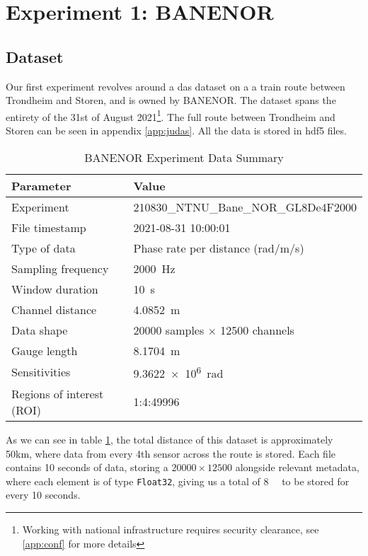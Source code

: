 \section{Experiment 1: BANENOR}


\subsection{Dataset}


Our first experiment revolves around a \acrshort{das} dataset on a a train route between Trondheim and Storen, and is owned by BANENOR. The dataset spans the entirety of the 31st of August 2021\footnote{Working with national infrastructure requires security clearance, see \ref{app:conf} for more details}. The full route between Trondheim and Storen can be seen in appendix \ref{app:judas}. All the data is stored in hdf5 files.

\begin{table}[!htbp]
    \centering
    \small
    \begin{tabular}{@{}p{}p{}@{}}
        \toprule
        \textbf{Parameter} & \textbf{Value} \\
        \midrule
        Experiment & 210830\_NTNU\_Bane\_NOR\_GL8De4F2000  \\
        File timestamp & 2021-08-31 10:00:01  \\
        Type of data & Phase rate per distance (rad/m/s) \\
        Sampling frequency & \qty{2000}{\si{\hertz}} \\
        Window duration & \qty{10}{\si{\second}} \\
        Channel distance & \qty{4.0852}{\si{\meter}} \\
        \midrule
        Data shape & 20000 samples \(\times\) 12500 channels  \\
        \midrule
        Gauge length & \qty{8.1704}{ \si{\meter}} \\
        Sensitivities & \qty{9.3622e6}{\si{\radian}
        }\\
        Regions of interest (ROI) & 1:4:49996 \\
        \bottomrule
    \end{tabular}
    \caption{BANENOR Experiment Data Summary}
    \label{tab:experiment_data}
\end{table}


As we can see in table \ref{tab:experiment_data}, the total distance of this dataset is approximately 50km, where data from every 4th sensor across the route is stored. Each file contains 10 seconds of data, storing a $20000 \times 12500$ alongside relevant metadata, where each element is of type \texttt{Float32}, giving us a total of \qty{8}{\giga\byte} to be stored for every 10 seconds.  \\


